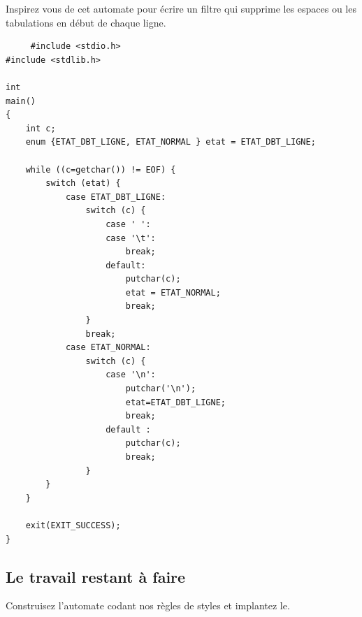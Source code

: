 \begin{exercice}
  Inspirez vous de cet automate pour \'ecrire un filtre qui supprime
  les espaces ou les tabulations en d\'ebut de chaque ligne.
   \ifcorrection%
   \begin{correction}
\begin{verbatim}
     #include <stdio.h>
#include <stdlib.h>

int 
main()
{
    int c;
    enum {ETAT_DBT_LIGNE, ETAT_NORMAL } etat = ETAT_DBT_LIGNE;
  
    while ((c=getchar()) != EOF) {
        switch (etat) {
            case ETAT_DBT_LIGNE:
                switch (c) {
                    case ' ':
                    case '\t':
                        break;
                    default:   
                        putchar(c);
                        etat = ETAT_NORMAL;
                        break;
                }
                break;
            case ETAT_NORMAL:
                switch (c) {
                    case '\n': 
                        putchar('\n');
                        etat=ETAT_DBT_LIGNE;
                        break;
                    default :  
                        putchar(c);
                        break;
                }
        }
    }

    exit(EXIT_SUCCESS);
}
\end{verbatim}
   \end{correction}
   \fi%
\end{exercice}

\subsection{Le travail restant \`a faire}
Construisez l'automate codant nos r\`egles de styles et implantez le.
